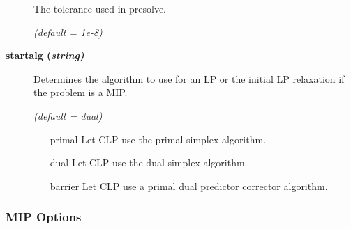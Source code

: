 \begin{description}
The tolerance used in presolve.

\textsl{(default = 1e-8)}

\item[\label{startalg}\hypertarget{startalg}
{\textbf{startalg (\slshape{string})}}]\hspace{1.0in}

Determines the algorithm to use for an LP or the initial LP relaxation if the problem is a MIP.

\textsl{(default = dual)}
\begin{itemize}
\item[primal] 
Let CLP use the primal simplex algorithm.
\item[dual] 
Let CLP use the dual simplex algorithm.
\item[barrier] 
Let CLP use a primal dual predictor corrector algorithm.
\end{itemize}

\end{description}

\subsubsection{MIP Options}


